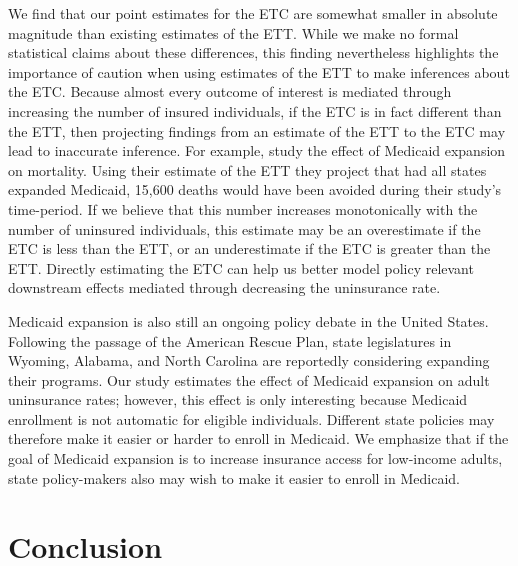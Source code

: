 \documentclass[aoas]{imsart}
\theoremstyle{plain}
\theoremstyle{remark}
\begin{document}
We find that our point estimates for the ETC are somewhat smaller in absolute magnitude than existing estimates of the ETT. While we make no formal statistical claims about these differences, this finding nevertheless highlights the importance of caution when using estimates of the ETT to make inferences about the ETC. Because almost every outcome of interest is mediated through increasing the number of insured individuals, if the ETC is in fact different than the ETT, then projecting findings from an estimate of the ETT to the ETC may lead to inaccurate inference. For example, \cite{miller2019medicaid} study the effect of Medicaid expansion on mortality. Using their estimate of the ETT they project that had all states expanded Medicaid, 15,600 deaths would have been avoided during their study's time-period. If we believe that this number increases monotonically with the number of uninsured individuals, this estimate may be an overestimate if the ETC is less than the ETT, or an underestimate if the ETC is greater than the ETT. Directly estimating the ETC can help us better model policy relevant downstream effects mediated through decreasing the uninsurance rate. 

Medicaid expansion is also still an ongoing policy debate in the United States. Following the passage of the American Rescue Plan, state legislatures in Wyoming, Alabama, and North Carolina are reportedly considering expanding their programs. Our study estimates the effect of Medicaid expansion on adult uninsurance rates; however, this effect is only interesting because Medicaid enrollment is not automatic for eligible individuals. Different state policies may therefore make it easier or harder to enroll in Medicaid. We emphasize that if the goal of Medicaid expansion is to increase insurance access for low-income adults, state policy-makers also may wish to make it easier to enroll in Medicaid. 

\section{Conclusion}
\end{document}
